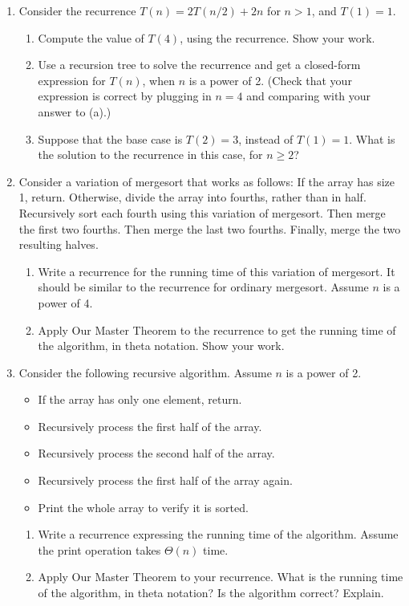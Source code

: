 \documentclass{article}
\begin{document}
\begin{enumerate}
    \item Consider the recurrence $T(n) = 2T(n/2) + 2n$ for $n > 1$, and $T(1) = 1$.
    \begin{enumerate}
        \item Compute the value of $T(4)$, using the recurrence. Show your work.
        \item Use a recursion tree to solve the recurrence and get a closed-form expression for $T(n)$, when $n$ is a power of 2. (Check that your expression is correct by plugging in $n = 4$ and comparing with your answer to (a).)
        \item Suppose that the base case is $T(2) = 3$, instead of $T(1) = 1$. What is the solution to the recurrence in this case, for $n \ge 2$?
    \end{enumerate}

    \item Consider a variation of mergesort that works as follows: If the array has size 1, return. Otherwise, divide the array into fourths, rather than in half. Recursively sort each fourth using this variation of mergesort. Then merge the first two fourths. Then merge the last two fourths. Finally, merge the two resulting halves.
    \begin{enumerate}
        \item Write a recurrence for the running time of this variation of mergesort. It should be similar to the recurrence for ordinary mergesort. Assume $n$ is a power of 4.
        \item Apply Our Master Theorem to the recurrence to get the running time of the algorithm, in theta notation. Show your work.
    \end{enumerate}

    \item Consider the following recursive algorithm. Assume $n$ is a power of 2.
    \begin{itemize}
        \item If the array has only one element, return.
        \item Recursively process the first half of the array.
        \item Recursively process the second half of the array.
        \item Recursively process the first half of the array again.
        \item Print the whole array to verify it is sorted.
    \end{itemize}
    \begin{enumerate}
        \item Write a recurrence expressing the running time of the algorithm.  Assume the print operation takes $\Theta(n)$ time.
        \item Apply Our Master Theorem to your recurrence. What is the running time of the algorithm, in theta notation?  Is the algorithm correct? Explain.
    \end{enumerate}



\end{enumerate}
\end{document}

